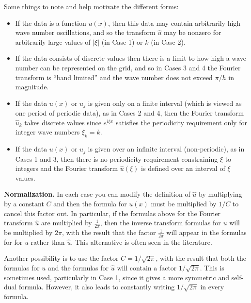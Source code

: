 \documentclass[11pt]{article}
\begin{document}
\newpage
\noindent 
Some things to note and help motivate the different forms:
\begin{itemize}
\item If the data is a function $u(x)$, then this data may contain
arbitrarily high wave number oscillations, and so the transform $\hat u$ may
be nonzero for arbitrarily large values of
$|\xi|$ (in Case 1) or $k$ (in Case 2).

\item If the data consists of discrete values then there is a limit to how
high a wave number can be represented on the grid, and so in Cases 3 and 4
the Fourier transform is ``band limited'' and the wave number does not
exceed $\pi / h$ in magnitude.  

\item If the data $u(x)$ or $u_j$ is given only on a finite interval (which
is viewed as
one period of periodic data), as in Cases 2 and 4, then the Fourier
transform $\hat u_k$ takes discrete values since $e^{i\xi x}$ satisfies
the periodicity requirement only for integer wave numbers $\xi_k=k$. 

\item If the data $u(x)$ or $u_j$ is given over an infinite interval
(non-periodic), as in Cases 1 and 3,
then there is no periodicity requirement constraining $\xi$ to integers
and the Fourier transform $\hat u(\xi)$ is defined over
an interval of $\xi$ values. 
\end{itemize}

\vskip 10pt
\noindent 
{\bf Normalization.}
\vskip 5pt
In each case you can modify the definition of $\hat u$ by
multiplying by a constant $C$ and then the formula for $u(x)$ must be
multiplied by $1/C$ to cancel this factor out.  In particular, if the
formulas above for the Fourier transform
$\hat u$ are multiplied by $\frac 1 {2\pi}$, then the
inverse transform formulas for $u$ will be multiplied by $2\pi$, with the
result that the factor $\frac 1{2\pi}$ will appear in the formulas for 
for $u$ rather than $\hat u$.  This alternative is often seen in the
literature.

Another possibility is to use the factor $C = 1/\sqrt{2\pi}$, with the
result that both the formulas for $u$ and the formulas for $\hat u$ 
will contain a
factor $1/\sqrt{2\pi}$. This is sometimes used, particularly in Case 1,
since it gives a more symmetric and self-dual formula.  However, it also
leads to constantly writing $1/\sqrt{2\pi}$ in every formula.
\end{document}
